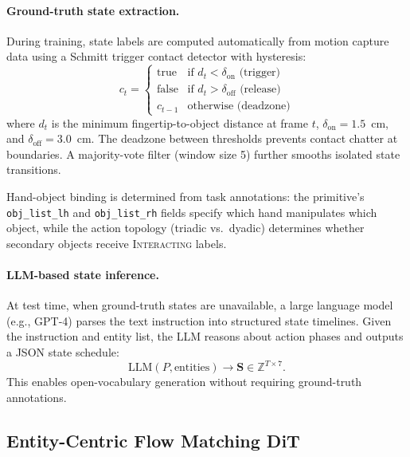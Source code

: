\paragraph{Ground-truth state extraction.}
During training, state labels are computed automatically from motion capture data using a Schmitt trigger contact detector with hysteresis:
\begin{equation}
    c_t = \begin{cases}
        \text{true} & \text{if } d_t < \delta_{\text{on}} \text{ (trigger)} \\
        \text{false} & \text{if } d_t > \delta_{\text{off}} \text{ (release)} \\
        c_{t-1} & \text{otherwise (deadzone)}
    \end{cases}
    \label{eq:schmitt}
\end{equation}
where $d_t$ is the minimum fingertip-to-object distance at frame $t$, $\delta_{\text{on}} = 1.5$~cm, and $\delta_{\text{off}} = 3.0$~cm. The deadzone between thresholds prevents contact chatter at boundaries. A majority-vote filter (window size 5) further smooths isolated state transitions.

Hand-object binding is determined from task annotations: the primitive's \texttt{obj\_list\_lh} and \texttt{obj\_list\_rh} fields specify which hand manipulates which object, while the action topology (triadic vs.\ dyadic) determines whether secondary objects receive \textsc{Interacting} labels.

\paragraph{LLM-based state inference.}
At test time, when ground-truth states are unavailable, a large language model (e.g., GPT-4) parses the text instruction into structured state timelines. Given the instruction and entity list, the LLM reasons about action phases and outputs a JSON state schedule:
\begin{equation}
    \text{LLM}(P, \text{entities}) \rightarrow \mathbf{S} \in \mathbb{Z}^{T \times 7}.
    \label{eq:llm_planner}
\end{equation}
This enables open-vocabulary generation without requiring ground-truth annotations.


\subsection{Entity-Centric Flow Matching DiT}
\label{sec:entity_dit}

